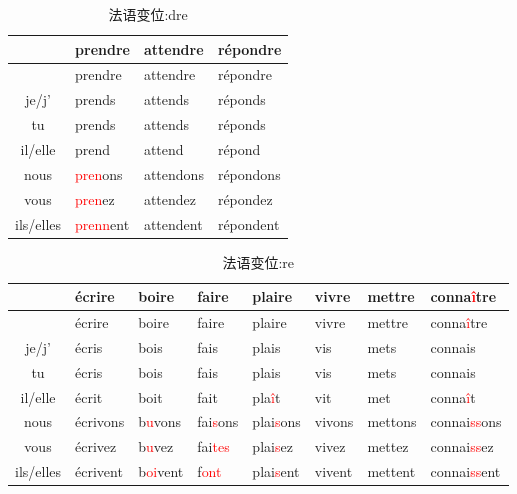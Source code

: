 \documentclass[12pt,A4paper,oneside,reqno]{amsart}
\numberwithin{equation}{section}
\theoremstyle{plain}
\theoremstyle{plain}
\theoremstyle{plain}
\numberwithin{equation}{section}
\theoremstyle{remark}
\begin{document}
	\begin{longtable}{c|l|l|l}
	\hline
	&	prendre	&	attendre	&	répondre	\\
	
	\hline
	\endhead
	\hline
	&	prendre	&	attendre	&	répondre	\\

	\hline
	\endfirsthead	
	\hline
	\endfoot
	\hline		
	\caption{法语变位:dre}
	\endlastfoot
								
je/j'	&	prends	&	attends	&	réponds	\\
tu	&	prends	&	attends	&	réponds	\\
il/elle	&	prend	&	attend	&	répond	\\
nous	&	\textcolor{red}{pren}ons	&	attendons	&	répondons	\\
vous	&	\textcolor{red}{pren}ez	&	attendez	&	répondez	\\
ils/elles	&	\textcolor{red}{prenn}ent	&	attendent	&	répondent	\\

	
	
	
	\hline								
\end{longtable}
	\begin{longtable}{c|l|l|l|l||l|l|l}
	\hline
	&	écrire	&	boire	&	faire	&	plaire	&	vivre	&	mettre	&	conna\textcolor{red}{î}tre	\\

	\hline
	\endhead
	\hline
	&	écrire	&	boire	&	faire	&	plaire	&	vivre	&	mettre	&	conna\textcolor{red}{î}tre	\\


	\hline
	\endfirsthead	
	\hline
	\endfoot
	\hline		
	\caption{法语变位:re}
	\endlastfoot
je/j'	&	écris	&	bois	&	fais	&	plais	&	vis	&	mets	&	connais	\\
tu	&	écris	&	bois	&	fais	&	plais	&	vis	&	mets	&	connais	\\
il/elle	&	écrit	&	boit	&	fait	&	pla\textcolor{red}{î}t	&	vit	&	met	&	conna\textcolor{red}{î}t	\\
nous	&	écrivons	&	b\textcolor{red}{u}vons	&	fai\textcolor{red}{s}ons	&	plai\textcolor{red}{s}ons	&	vivons	&	mettons	&	connai\textcolor{red}{ss}ons	\\
vous	&	écrivez	&	b\textcolor{red}{u}vez	&	fai\textcolor{red}{tes}	&	plai\textcolor{red}{s}ez	&	vivez	&	mettez	&	connai\textcolor{red}{ss}ez	\\
ils/elles	&	écrivent	&	b\textcolor{red}{oi}vent	&	f\textcolor{red}{ont}	&	plai\textcolor{red}{s}ent	&	vivent	&	mettent	&	connai\textcolor{red}{ss}ent	\\

	
	
	\hline								
\end{longtable}
\end{document}
